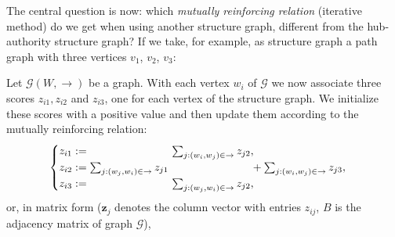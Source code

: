 \documentclass[a4paper,11pt]{report}
\newcommand{\graf}{\mathscr{G}}
\begin{document}
The central question is now: which \emph{mutually reinforcing relation} (iterative method) do we get when using another structure graph, 
different from the hub-authority structure graph? 
If we take, for example, as structure graph a path graph with three vertices $v_1$, $v_2$, 
$v_3$:
\begin{center}
\end{center}
Let $\graf(W,\to)$ be a graph. With each vertex $w_i$ of $\graf$ we now associate three scores $z_{i1}, z_{i2}$ and 
$z_{i3}$, one for each vertex of the structure graph. We initialize these scores 
with a positive value and then update them according to the mutually reinforcing 
relation:
$$\begin{cases} z_{i1} := \hspace{75px} \sum_{j:(w_i,w_j)\in \to} z_{j2},\\ 
z_{i2} := \sum_{j:(w_j,w_i)\in \to} z_{j1}\hspace{75px} + \sum_{j:(w_i,w_j)\in \to} z_{j3},\\
z_{i3} := \hspace{75px}\sum_{j:(w_j,w_i)\in \to} z_{j2},
\end{cases}$$or, in matrix form ($\mathbf{z}_j$ denotes the column vector with entries $z_{ij}$, $B$ is the adjacency matrix of graph $\graf$),
\end{document}
